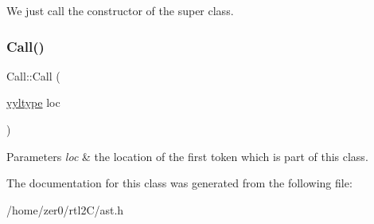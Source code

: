 We just call the constructor of the super class. \mbox{\label{class_call_a3f36557e042b3913d540207d8243a2ca}} 
\subsubsection{\texorpdfstring{Call()}{Call()}\hspace{0.1cm}{\footnotesize\ttfamily [2/2]}}
{\footnotesize\ttfamily Call\+::\+Call (\begin{DoxyParamCaption}\item[{\hyperlink{structyyltype}{yyltype}}]{loc }\end{DoxyParamCaption})\hspace{0.3cm}{\ttfamily [inline]}}


\begin{DoxyParams}{Parameters}
{\em loc} & the location of the first token which is part of this class. \\
\hline
\end{DoxyParams}


The documentation for this class was generated from the following file\+:\begin{DoxyCompactItemize}
\item 
/home/zer0/rtl2\+C/ast.\+h\end{DoxyCompactItemize}
